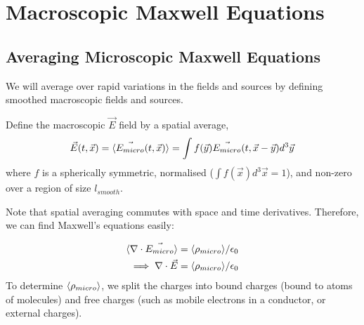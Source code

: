 \documentclass[../Main.tex]{subfiles}
\begin{document}
\section{Macroscopic Maxwell Equations}
\subsection{Averaging Microscopic Maxwell Equations}
We will average over rapid variations in the fields and sources by defining smoothed macroscopic fields and sources. 

Define the macroscopic $\vec E$ field by a spatial average,
\begin{equation*}
    \vec E(t, \vec x) = \langle\vec{E_{micro}}(t, \vec x)\rangle = \int f(\vec y) \vec{E_{micro}} (t, \vec x - \vec y) d^3\vec y
\end{equation*}
where $f$ is a spherically symmetric, normalised ($\int f(\vec x) d^3\vec x = 1$), and non-zero over a region of size $l_{smooth}$.

Note that spatial averaging commutes with space and time derivatives. Therefore, we can find Maxwell's equations easily:

\begin{align*}
    \langle\nabla \cdot \vec{E_{micro}}\rangle &= \langle\rho_{micro}\rangle / \epsilon_0 \\
    \implies \nabla \cdot \vec{E} &= \langle\rho_{micro}\rangle / \epsilon_0
\end{align*}
To determine $\langle\rho_{micro}\rangle$, we split the charges into bound charges (bound to atoms of molecules) and free charges (such as mobile electrons in a conductor, or external charges).
\end{document}
